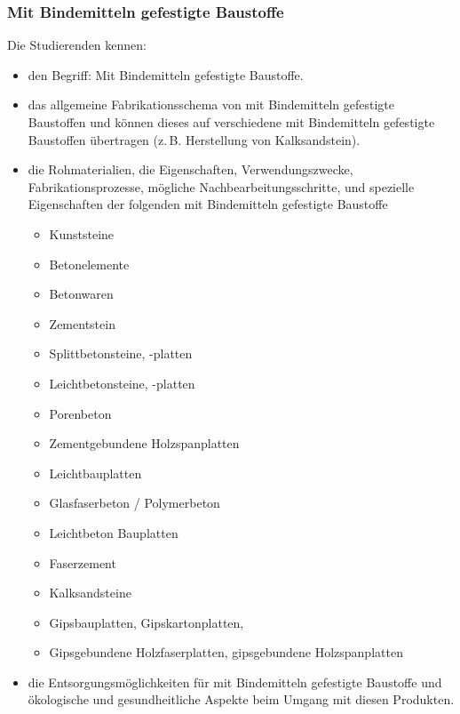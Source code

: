 \subsubsection*{Mit Bindemitteln gefestigte Baustoffe}
Die Studierenden kennen: 

\begin{itemize}[noitemsep]
	\item den Begriff: Mit Bindemitteln gefestigte Baustoffe.
	\item das allgemeine Fabrikationsschema von mit Bindemitteln gefestigte Baustoffen und können dieses auf verschiedene mit Bindemitteln gefestigte Baustoffen übertragen (z.\,B. Herstellung von Kalksandstein).
	\item die Rohmaterialien, die Eigenschaften, Verwendungszwecke, Fabrikationsprozesse, mögliche Nachbearbeitungsschritte, und spezielle Eigenschaften der folgenden mit Bindemitteln gefestigte Baustoffe
	\begin{itemize}[noitemsep]
  \item Kunststeine
  \item Betonelemente
  \item Betonwaren
  \item Zementstein
  \item Splittbetonsteine, -platten
  \item Leichtbetonsteine, -platten
  \item Porenbeton
  \item Zementgebundene Holzspanplatten
  \item Leichtbauplatten
  \item Glasfaserbeton / Polymerbeton
  \item  Leichtbeton Bauplatten
  \item Faserzement
  \item Kalksandsteine
  \item Gipsbauplatten,  Gipskartonplatten, 
  \item Gipsgebundene Holzfaserplatten, gipsgebundene Holzspanplatten
\end{itemize}
	\item die Entsorgungsmöglichkeiten für mit Bindemitteln gefestigte Baustoffe und ökologische und gesundheitliche Aspekte beim Umgang mit diesen Produkten.
\end{itemize}